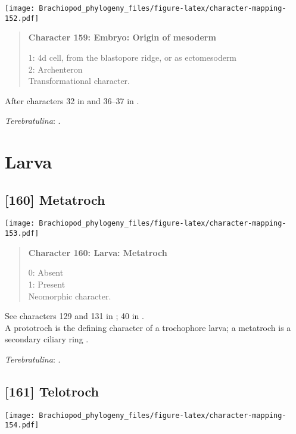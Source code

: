 \documentclass[openany]{book}
\theoremstyle{definition}
\theoremstyle{definition}
\theoremstyle{definition}
\theoremstyle{remark}
\begin{document}
\texttt{[image: Brachiopod\_phylogeny\_files/figure-latex/character-mapping-152.pdf]}

\begin{quote}
\textbf{Character 159: Embryo: Origin of mesoderm}

1: 4d cell, from the blastopore ridge, or as ectomesoderm\\
2: Archenteron\\
Transformational character.
\end{quote}

After characters 32 in \citet{Grobe2007} and 36--37 in
\citet{Glenner2004}.

\hypertarget{Terebratulina-coding-159}{}
\emph{Terebratulina}: \citet{Williams1997Introduction}.

\section{Larva}\label{larva}

\subsection*{{[}160{]} Metatroch}\label{metatroch}

\texttt{[image: Brachiopod\_phylogeny\_files/figure-latex/character-mapping-153.pdf]}

\begin{quote}
\textbf{Character 160: Larva: Metatroch}

0: Absent\\
1: Present\\
Neomorphic character.
\end{quote}

See characters 129 and 131 in \citet{Rouse1999}; 40 in
\citet{Haszprunar1996}.\\
A prototroch is the defining character of a trochophore larva; a
metatroch is a secondary ciliary ring \citep{Rouse1999}.

\hypertarget{Terebratulina-coding-160}{}
\emph{Terebratulina}: \citet{Williams1997Introduction}.

\subsection*{{[}161{]} Telotroch}\label{telotroch}

\texttt{[image: Brachiopod\_phylogeny\_files/figure-latex/character-mapping-154.pdf]}
\end{document}
